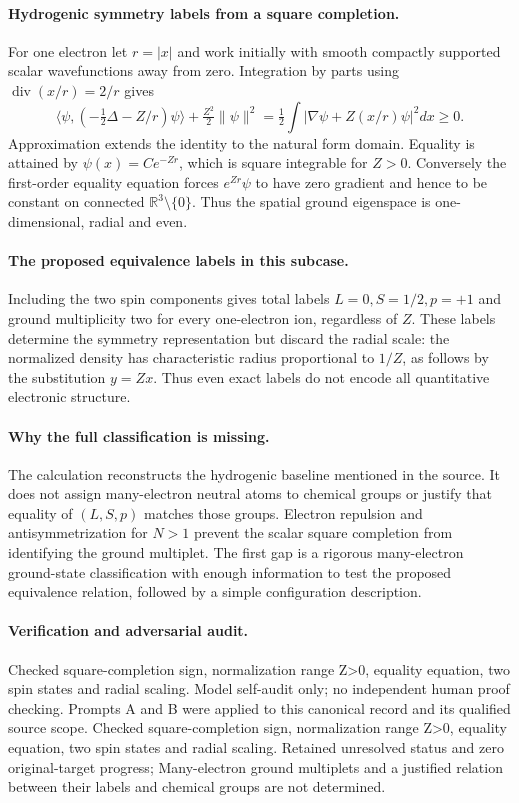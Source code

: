\documentclass[11pt]{article}
\begin{document}
\paragraph{Hydrogenic symmetry labels from a square completion.} For one electron let $r=|x|$ and work initially with smooth compactly supported scalar wavefunctions away from zero. Integration by parts using $\operatorname{div}(x/r)=2/r$ gives
\[
 \langle\psi,(-\tfrac12\Delta-Z/r)\psi\rangle
 +\tfrac{Z^2}{2}\|\psi\|^2
 =\tfrac12\int|\nabla\psi+Z(x/r)\psi|^2dx\geq0.
\]
Approximation extends the identity to the natural form domain. Equality is attained by $\psi(x)=Ce^{-Zr}$, which is square integrable for $Z>0$. Conversely the first-order equality equation forces $e^{Zr}\psi$ to have zero gradient and hence to be constant on connected $\mathbb R^3\setminus\{0\}$. Thus the spatial ground eigenspace is one-dimensional, radial and even.

\paragraph{The proposed equivalence labels in this subcase.} Including the two spin components gives total labels $L=0,S=1/2,p=+1$ and ground multiplicity two for every one-electron ion, regardless of $Z$. These labels determine the symmetry representation but discard the radial scale: the normalized density has characteristic radius proportional to $1/Z$, as follows by the substitution $y=Zx$. Thus even exact labels do not encode all quantitative electronic structure.

\paragraph{Why the full classification is missing.} The calculation reconstructs the hydrogenic baseline mentioned in the source. It does not assign many-electron neutral atoms to chemical groups or justify that equality of $(L,S,p)$ matches those groups. Electron repulsion and antisymmetrization for $N>1$ prevent the scalar square completion from identifying the ground multiplet. The first gap is a rigorous many-electron ground-state classification with enough information to test the proposed equivalence relation, followed by a simple configuration description.

\paragraph{Verification and adversarial audit.}
Checked square-completion sign, normalization range Z>0, equality equation, two spin states and radial scaling. Model self-audit only; no independent human proof checking. Prompts A and B were applied to this canonical record and its qualified source scope. Checked square-completion sign, normalization range Z>0, equality equation, two spin states and radial scaling. Retained unresolved status and zero original-target progress; Many-electron ground multiplets and a justified relation between their labels and chemical groups are not determined.
\end{document}
